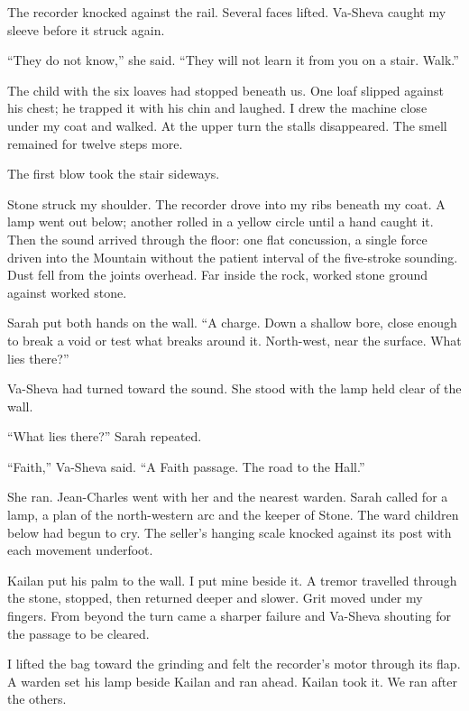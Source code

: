 The recorder knocked against the rail. Several faces lifted. Va-Sheva caught my sleeve before it struck again.\par

``They do not know,'' she said. ``They will not learn it from you on a stair. Walk.''\par

The child with the six loaves had stopped beneath us. One loaf slipped against his chest; he trapped it with his chin and laughed. I drew the machine close under my coat and walked. At the upper turn the stalls disappeared. The smell remained for twelve steps more.\par

\ornament

The first blow took the stair sideways.\par

Stone struck my shoulder. The recorder drove into my ribs beneath my coat. A lamp went out below; another rolled in a yellow circle until a hand caught it. Then the sound arrived through the floor: one flat concussion, a single force driven into the Mountain without the patient interval of the five-stroke sounding. Dust fell from the joints overhead. Far inside the rock, worked stone ground against worked stone.\par

Sarah put both hands on the wall. ``A charge. Down a shallow bore, close enough to break a void or test what breaks around it. North-west, near the surface. What lies there?''\par

Va-Sheva had turned toward the sound. She stood with the lamp held clear of the wall.\par

``What lies there?'' Sarah repeated.\par

``Faith,'' Va-Sheva said. ``A Faith passage. The road to the Hall.''\par

She ran. Jean-Charles went with her and the nearest warden. Sarah called for a lamp, a plan of the north-western arc and the keeper of Stone. The ward children below had begun to cry. The seller's hanging scale knocked against its post with each movement underfoot.\par

Kailan put his palm to the wall. I put mine beside it. A tremor travelled through the stone, stopped, then returned deeper and slower. Grit moved under my fingers. From beyond the turn came a sharper failure and Va-Sheva shouting for the passage to be cleared.\par

I lifted the bag toward the grinding and felt the recorder's motor through its flap. A warden set his lamp beside Kailan and ran ahead. Kailan took it. We ran after the others.\par
